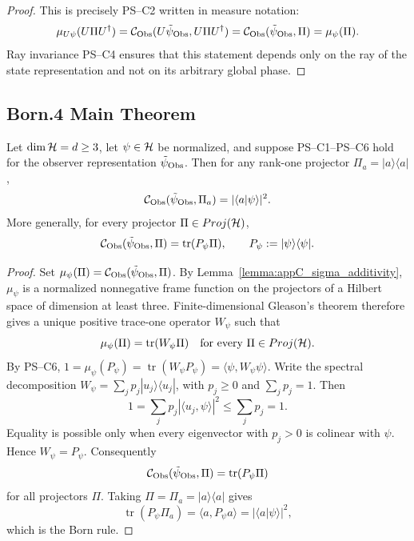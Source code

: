 \begin{proof}
\label{proof:appC_unitary_invariance}
This is precisely PS--C2 written in measure notation:
\[
\mu_{U\psi}(U\Pi U^\dagger)
=\mathcal{C}_{\mathrm{Obs}}(U\tilde\psi_{\mathrm{Obs}},U\Pi U^\dagger)
=\mathcal{C}_{\mathrm{Obs}}(\tilde\psi_{\mathrm{Obs}},\Pi)
=\mu_\psi(\Pi).
\]
Ray invariance PS--C4 ensures that this statement depends only on the ray of the
state representation and not on its arbitrary global phase.
\end{proof}

\subsection{Born.4 Main Theorem}
\label{subsec:appC_born_theorem}

\begin{theorem}
\label{theorem:appC_born_rule}
Let $\dim \mathcal{H} = d \geq 3$, let $\psi\in\mathcal{H}$ be normalized, and suppose
PS--C1--PS--C6 hold for the observer representation $\tilde\psi_{\mathrm{Obs}}$. Then for
any rank-one projector $\Pi_a = |a\rangle \langle a|$,
\[
\mathcal{C}_{\mathrm{Obs}}(\tilde\psi_{\mathrm{Obs}}, \Pi_a)
= |\langle a | \psi \rangle|^2 .
\]
More generally, for every projector $\Pi\in Proj(\mathcal{H})$,
\[
\mathcal{C}_{\mathrm{Obs}}(\tilde\psi_{\mathrm{Obs}},\Pi)=\operatorname{tr}(P_\psi\Pi),
\qquad P_\psi:=|\psi\rangle\langle\psi|.
\]
\end{theorem}

\begin{proof}
\label{proof:appC_born_rule}
Set $\mu_\psi(\Pi)=\mathcal{C}_{\mathrm{Obs}}(\tilde\psi_{\mathrm{Obs}},\Pi)$. By
Lemma~\ref{lemma:appC_sigma_additivity}, $\mu_\psi$ is a normalized nonnegative
frame function on the projectors of a Hilbert space of dimension at least three.
Finite-dimensional Gleason's theorem therefore gives a unique positive trace-one
operator $W_\psi$ such that
\[
\mu_\psi(\Pi)=\operatorname{tr}(W_\psi\Pi)
\quad\text{for every }\Pi\in Proj(\mathcal{H}).
\]
By PS--C6, $1=\mu_\psi(P_\psi)=\operatorname{tr}(W_\psi P_\psi)
=\langle\psi,W_\psi\psi\rangle$. Write the spectral decomposition
$W_\psi=\sum_j p_j |u_j\rangle\langle u_j|$, with $p_j\ge0$ and
$\sum_j p_j=1$. Then
\[
1=\sum_j p_j |\langle u_j,\psi\rangle|^2 \le \sum_j p_j=1.
\]
Equality is possible only when every eigenvector with $p_j>0$ is colinear with
$\psi$. Hence $W_\psi=P_\psi$. Consequently
\[
\mathcal{C}_{\mathrm{Obs}}(\tilde\psi_{\mathrm{Obs}},\Pi)
=\operatorname{tr}(P_\psi\Pi)
\]
for all projectors $\Pi$. Taking $\Pi=\Pi_a=|a\rangle\langle a|$ gives
\[
\operatorname{tr}(P_\psi\Pi_a)=\langle a,P_\psi a\rangle
=|\langle a|\psi\rangle|^2,
\]
which is the Born rule.
\end{proof}

